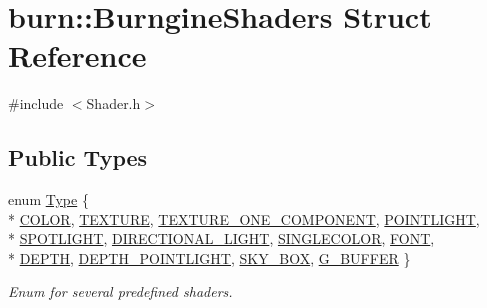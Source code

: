 \hypertarget{structburn_1_1_burngine_shaders}{\section{burn\-:\-:Burngine\-Shaders Struct Reference}
\label{structburn_1_1_burngine_shaders}
}


{\ttfamily \#include $<$Shader.\-h$>$}

\subsection*{Public Types}
\begin{DoxyCompactItemize}
\item 
enum \hyperlink{structburn_1_1_burngine_shaders_a2c339d4b838b7efe94ba8ef7f480ef41}{Type} \{ \\*
\hyperlink{structburn_1_1_burngine_shaders_a2c339d4b838b7efe94ba8ef7f480ef41a446d1261300dfabf6e08f66e60f8ed5c}{C\-O\-L\-O\-R}, 
\hyperlink{structburn_1_1_burngine_shaders_a2c339d4b838b7efe94ba8ef7f480ef41a3862d81a77979610dad2455f8d7613a2}{T\-E\-X\-T\-U\-R\-E}, 
\hyperlink{structburn_1_1_burngine_shaders_a2c339d4b838b7efe94ba8ef7f480ef41a922d3a6c0c8866d89903aec559196fad}{T\-E\-X\-T\-U\-R\-E\-\_\-\-O\-N\-E\-\_\-\-C\-O\-M\-P\-O\-N\-E\-N\-T}, 
\hyperlink{structburn_1_1_burngine_shaders_a2c339d4b838b7efe94ba8ef7f480ef41ad7d22e0ffe363d94429c03e2c10fb191}{P\-O\-I\-N\-T\-L\-I\-G\-H\-T}, 
\\*
\hyperlink{structburn_1_1_burngine_shaders_a2c339d4b838b7efe94ba8ef7f480ef41a5172978e4e2117de6a05416367a1860d}{S\-P\-O\-T\-L\-I\-G\-H\-T}, 
\hyperlink{structburn_1_1_burngine_shaders_a2c339d4b838b7efe94ba8ef7f480ef41a0386e42429e97f12aa62b0f2541d283a}{D\-I\-R\-E\-C\-T\-I\-O\-N\-A\-L\-\_\-\-L\-I\-G\-H\-T}, 
\hyperlink{structburn_1_1_burngine_shaders_a2c339d4b838b7efe94ba8ef7f480ef41aeb97d831b98acc3f5156874f45971e9f}{S\-I\-N\-G\-L\-E\-C\-O\-L\-O\-R}, 
\hyperlink{structburn_1_1_burngine_shaders_a2c339d4b838b7efe94ba8ef7f480ef41aad14732ddfa6f0cde189b342ceaa66d7}{F\-O\-N\-T}, 
\\*
\hyperlink{structburn_1_1_burngine_shaders_a2c339d4b838b7efe94ba8ef7f480ef41ad85ec8bf4f61842aebd3f8023ea14f6e}{D\-E\-P\-T\-H}, 
\hyperlink{structburn_1_1_burngine_shaders_a2c339d4b838b7efe94ba8ef7f480ef41a72bda762a6e5151c4a63cd8d70a68755}{D\-E\-P\-T\-H\-\_\-\-P\-O\-I\-N\-T\-L\-I\-G\-H\-T}, 
\hyperlink{structburn_1_1_burngine_shaders_a2c339d4b838b7efe94ba8ef7f480ef41ab12073258bb6013b7af990d46b197005}{S\-K\-Y\-\_\-\-B\-O\-X}, 
\hyperlink{structburn_1_1_burngine_shaders_a2c339d4b838b7efe94ba8ef7f480ef41ac9d1b1a94a02f93de369c72e798ce318}{G\-\_\-\-B\-U\-F\-F\-E\-R}
 \}
\begin{DoxyCompactList}\small\item\em Enum for several predefined shaders. \end{DoxyCompactList}\end{DoxyCompactItemize}
